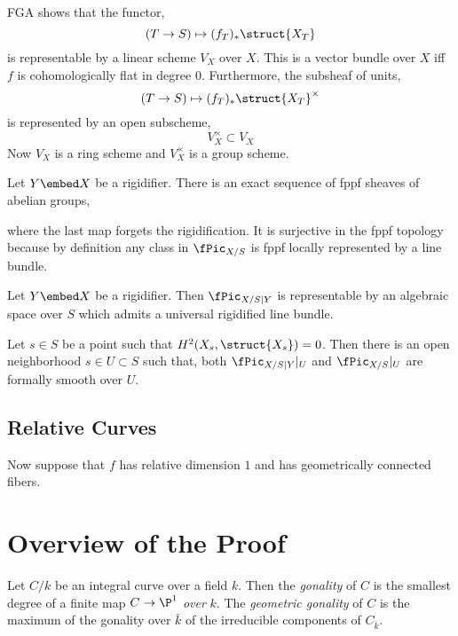 \documentclass[12pt]{article}
\begin{document}
FGA shows that the functor,
\[ (T \to S) \mapsto (f_T)_* \struct{X_T} \]
is representable by a linear scheme $V_X$ over $X$. This is a vector bundle over $X$ iff $f$ is cohomologically flat in degree $0$. Furthermore, the subsheaf of units,
\[ (T \to S) \mapsto (f_T)_* \struct{X_T}^\times \]
is represented by an open subscheme,
\[ V_X^\times \subset V_X \]
Now $V_X$ is a ring scheme and $V_X^\times$ is a group scheme. 

\begin{prop}
Let $Y \embed X$ be a rigidifier. 
There is an exact sequence of fppf sheaves of abelian groups,
\begin{center}
\end{center}
where the last map forgets the rigidification. It is surjective in the fppf topology because by definition any class in $\fPic_{X/S}$ is fppf locally represented by a line bundle.
\end{prop}

\begin{theorem}[8.3.3]
Let $Y \embed X$ be a rigidifier. Then $\fPic_{X/S|Y}$ is representable by an algebraic space over $S$ which admits a universal rigidified line bundle.
\end{theorem}

\begin{prop}
Let $s \in S$ be a point such that $H^2(X_s, \struct{X_s}) = 0$. Then there is an open neighborhood $s \in U \subset S$ such that, both $\fPic_{X/S|Y}|_U$ and $\fPic_{X/S}|_U$ are formally smooth over $U$.
\end{prop}

\subsection{Relative Curves}

Now suppose that $f$ has relative dimension $1$ and has geometrically connected fibers.


\section{Overview of the Proof}

\newcommand{\gon}{\mathrm{gon}}

\begin{defn}
Let $C/k$ be an integral curve over a field $k$. Then the \textit{gonality} of $C$ is the smallest degree of a finite map $C \to \P^1$ \textit{over} $k$. The \textit{geometric gonality} of $C$ is the maximum of the gonality over $\bar{k}$ of the irreducible components of $C_{\bar{k}}$. 
\end{defn}
\end{document}
